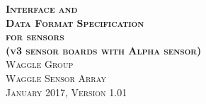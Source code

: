\documentclass{article}
\begin{document}
\begin{titlepage}
   \begin{center}
        \Huge\textbf{\textsc{Interface and \\ Data Format Specification \\ for sensors \\
        \Large\textsc(v3 sensor boards with Alpha sensor)}}\\[0.5cm]
        \Large\textsc{Waggle Group \\ Waggle Sensor Array}\\[1cm]
        \large\textsc{January 2017, }
        \large\textsc{Version 1.01}\\
   \end{center}
\end{titlepage}

\tableofcontents
\newpage










\appendix

\end{document}
